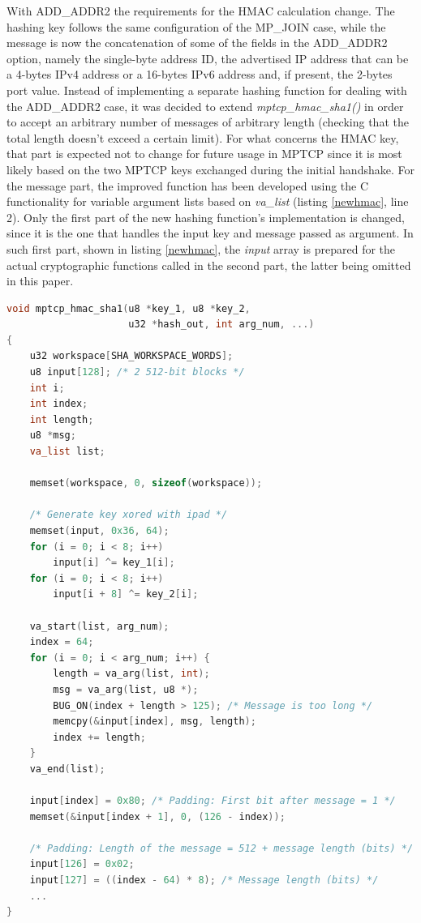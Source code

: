 With ADD\_ADDR2 the requirements for the HMAC calculation change. The hashing key follows the same configuration of the MP\_JOIN case, while the message is now the concatenation of some of the fields in the ADD\_ADDR2 option, namely the single-byte address ID, the advertised IP address that can be a 4-bytes IPv4 address or a 16-bytes IPv6 address and, if present, the 2-bytes port value. Instead of implementing a separate hashing function for dealing with the ADD\_ADDR2 case,  it was decided to extend \textit{mptcp\_hmac\_sha1()} in order to accept an arbitrary number of messages of arbitrary length (checking that the total length doesn't exceed a certain limit). For what concerns the HMAC key, that part is expected not to change for future usage in MPTCP since it is most likely based on the two MPTCP keys exchanged during the initial handshake. For the message part, the improved function has been developed using the C functionality for variable argument lists based on \textit{va\_list} (listing \ref{newhmac}, line 2). Only the first part of the new hashing function's implementation is changed, since it is the one that handles the input key and message passed as argument. In such first part, shown in listing \ref{newhmac}, the \textit{input} array is prepared for the actual cryptographic functions called in the second part, the latter being omitted in this paper.

\begin{lstlisting}[language=c, caption=Implementation for the new \textit{mptcp\_hmac\_sha1() function (first part)}, label=newhmac]
void mptcp_hmac_sha1(u8 *key_1, u8 *key_2,
                     u32 *hash_out, int arg_num, ...)
{
    u32 workspace[SHA_WORKSPACE_WORDS];
	u8 input[128]; /* 2 512-bit blocks */
	int i;
	int index;
	int length;
	u8 *msg;
	va_list list;

	memset(workspace, 0, sizeof(workspace));

	/* Generate key xored with ipad */
	memset(input, 0x36, 64);
	for (i = 0; i < 8; i++)
		input[i] ^= key_1[i];
	for (i = 0; i < 8; i++)
		input[i + 8] ^= key_2[i];

	va_start(list, arg_num);
	index = 64;
	for (i = 0; i < arg_num; i++) {
		length = va_arg(list, int);
		msg = va_arg(list, u8 *);
		BUG_ON(index + length > 125); /* Message is too long */
		memcpy(&input[index], msg, length);
		index += length;
	}
	va_end(list);

	input[index] = 0x80; /* Padding: First bit after message = 1 */
	memset(&input[index + 1], 0, (126 - index));

	/* Padding: Length of the message = 512 + message length (bits) */
	input[126] = 0x02;
	input[127] = ((index - 64) * 8); /* Message length (bits) */
	...
}
\end{lstlisting}

